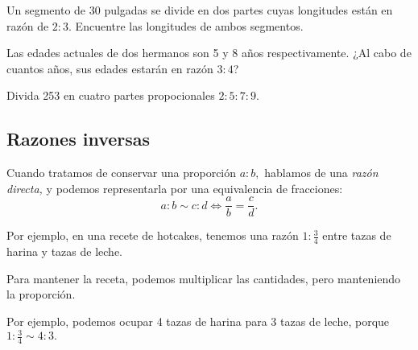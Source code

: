% 
% 		
% 	
% 


	\begin{problema}
		Un segmento de 30 pulgadas se divide en dos partes cuyas longitudes están en raz\'on de $2:3.$ Encuentre las longitudes de ambos segmentos.
	\end{problema}
	



	\begin{problema}
		Las edades actuales de dos hermanos son 5 y 8 años respectivamente. ¿Al cabo de cuantos años, sus edades estarán en raz\'on $3:4$?
	\end{problema}
	



	\begin{problema}
		Divida 253 en cuatro partes propocionales $2:5:7:9.$
	\end{problema}
	


\subsection{Razones inversas}


	Cuando tratamos de conservar una proporci\'on $a:b,$ hablamos de una \emph{raz\'on directa,} y podemos representarla por una equivalencia de fracciones:
	$$
	a:b \sim c:d \Leftrightarrow
	\dfrac{a}{b} = \dfrac{c}{d}.
	$$



	Por ejemplo, en una recete de hotcakes, tenemos una raz\'on
	$1:\frac{3}{4}$ entre tazas de harina y tazas de leche.
	



	Para mantener la receta, podemos multiplicar las cantidades, pero manteniendo la proporci\'on. 
	



	Por ejemplo, podemos ocupar 4 tazas de harina para 3 tazas de leche, porque 
	$1:\frac{3}{4} \sim 4:3.$




